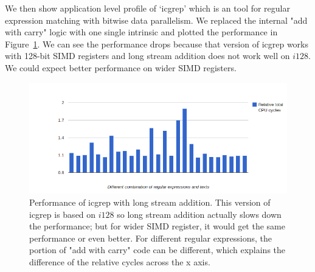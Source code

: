 We then show application level profile of `icgrep' which is an tool for regular expression matching with bitwise data parallelism. We replaced the internal "add with carry" logic with one single intrinsic and plotted the performance in Figure~\ref{figure:lsadd_icgrep}. We can see the performance drops because that version of icgrep works with 128-bit SIMD registers and long stream addition does not work well on $i128$. We could expect better performance on wider SIMD registers.

\begin{figure}[ht!]
\centering
\includegraphics[width=140mm]{draw/lsadd_icgrep.png}
\caption[Performance of icgrep with long stream addition]{Performance of icgrep with long stream addition. This version of icgrep is based on $i128$ so long stream addition actually slows down the performance; but for wider SIMD register, it would get the same performance or even better. For different regular expressions, the portion of "add with carry" code can be different, which explains the difference of the relative cycles across the x axis.}
\label{figure:lsadd_icgrep}
\end{figure}
